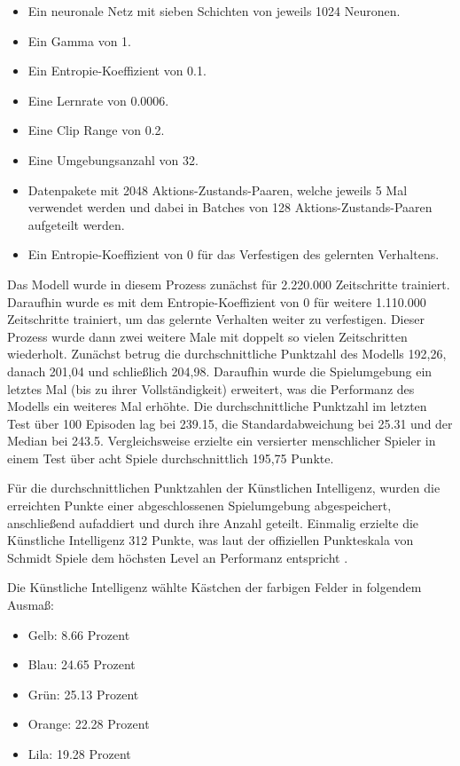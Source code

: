 \begin{itemize} 
\item Ein neuronale Netz mit sieben Schichten von jeweils 1024 Neuronen. 

\item Ein Gamma von 1. 

\item Ein Entropie-Koeffizient von 0.1. 

\item Eine Lernrate von 0.0006. 

\item Eine Clip Range von 0.2. 

\item Eine Umgebungsanzahl von 32. 

\item Datenpakete mit 2048 Aktions-Zustands-Paaren, welche jeweils 5 Mal verwendet werden und dabei in Batches von 128 Aktions-Zustands-Paaren aufgeteilt werden. 

\item Ein Entropie-Koeffizient von 0 für das Verfestigen des gelernten Verhaltens. 
\end{itemize} 

Das Modell wurde in diesem Prozess zunächst für 2.220.000 Zeitschritte trainiert. Daraufhin wurde es mit dem Entropie-Koeffizient von 0 für weitere 1.110.000 Zeitschritte trainiert, um das gelernte Verhalten weiter zu verfestigen. Dieser Prozess wurde dann zwei weitere Male mit doppelt so vielen Zeitschritten wiederholt. Zunächst betrug die durchschnittliche Punktzahl des Modells 192,26, danach 201,04 und schließlich 204,98. Daraufhin wurde die Spielumgebung ein letztes Mal (bis zu ihrer Vollständigkeit) erweitert, was die Performanz des Modells ein weiteres Mal erhöhte. Die durchschnittliche Punktzahl im letzten Test über 100 Episoden lag bei 239.15, die Standardabweichung bei 25.31 und der Median bei 243.5. Vergleichsweise erzielte ein versierter menschlicher Spieler in einem Test über acht Spiele durchschnittlich 195,75 Punkte.

Für die durchschnittlichen Punktzahlen der Künstlichen Intelligenz, wurden die erreichten Punkte einer abgeschlossenen Spielumgebung abgespeichert, anschließend aufaddiert und durch ihre Anzahl geteilt. Einmalig erzielte die Künstliche Intelligenz 312 Punkte, was laut der offiziellen Punkteskala von Schmidt Spiele dem höchsten Level an Performanz entspricht \cite{schmidtspiele_ganzschonclever}. 

\newpage
Die Künstliche Intelligenz wählte Kästchen der farbigen Felder in folgendem Ausmaß:
\begin{itemize} 
\item Gelb: 8.66 Prozent
\item Blau: 24.65 Prozent
\item Grün: 25.13 Prozent
\item Orange: 22.28 Prozent
\item Lila: 19.28 Prozent
\end{itemize} 

